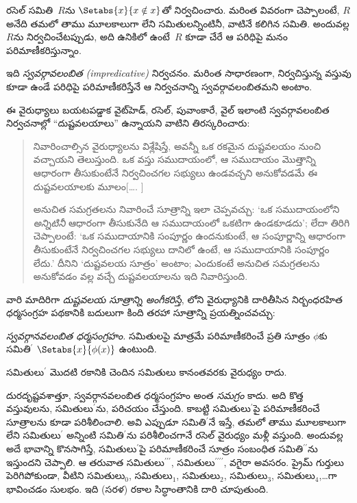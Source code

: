 \documentclass[../../../include/open-logic-section]{subfiles}
\begin{document}


రసెల్ సమితి~$R$ను
$\Setabs{x}{x \notin
x}$తో నిర్వచించారు. మరింత
వివరంగా చెప్పాలంటే, $R$
అనేది తమలో తాము మూలకాలుగా
లేని సమితులన్నింటినీ,
వాటినే కలిగిన సమితి.
అందువల్ల $R$ను నిర్వచించేటప్పుడు, అది ఉనికిలో ఉంటే~$R$ కూడా
చేరే ఆ పరిధిపై మనం పరిమాణీకరిస్తున్నాం.

ఇది \emph{స్వవర్గావలంబిత
(impredicative)} నిర్వచనం.
మరింత సాధారణంగా, నిర్వచిస్తున్న వస్తువు కూడా
ఉండే పరిధిపై పరిమాణీకరిస్తేనే ఆ నిర్వచనాన్ని
స్వవర్గావలంబితమని అంటాం.
	
ఈ వైరుధ్యాలు బయటపడ్డాక వైట్‌హెడ్,
రసెల్, పువాంకారే, వైల్
ఇలాంటి స్వవర్గావలంబిత
నిర్వచనాల్లో ``దుష్టవలయాలు'' ఉన్నాయని
వాటిని తిరస్కరించారు:
\begin{quote}
	నివారించాల్సిన వైరుధ్యాలను
	విశ్లేషిస్తే, అవన్నీ ఒక రకమైన
	దుష్టవలయం నుంచి వచ్చాయని
	తెలుస్తుంది. ఒక వస్తు సముదాయంలో,
	ఆ సముదాయం మొత్తాన్ని ఆధారంగా
	తీసుకుంటేనే నిర్వచించగల
	సభ్యులు ఉండవచ్చని
	అనుకోవడమే ఈ దుష్టవలయాలకు
	మూలం[\ldots. \textparagraph]

	అనుచిత సమగ్రతలను నివారించే
	సూత్రాన్ని ఇలా చెప్పవచ్చు:
	`ఒక సముదాయంలోని \emph{అన్నిటినీ}
	ఆధారంగా తీసుకునేది ఆ
	సముదాయంలో ఒకటిగా ఉండకూడదు';
	లేదా తిరిగి చెప్పాలంటే:
	`ఒక సముదాయానికి సంపూర్ణం
	ఉందనుకుంటే, ఆ సంపూర్ణాన్ని
	ఆధారంగా తీసుకుంటేనే
	నిర్వచించగల సభ్యులు దానిలో
	ఉంటే, ఆ సముదాయానికి
	సంపూర్ణం లేదు.' దీనిని
	`దుష్టవలయ సూత్రం' అంటాం;
	ఎందుకంటే అనుచిత సమగ్రతలను
	అనుకోవడం వల్ల వచ్చే
	దుష్టవలయాలను ఇది
	నివారిస్తుంది.
	\citep[p.~37]{WhiteheadRussell1910}
\end{quote}
వారి మాదిరిగా \emph{దుష్టవలయ
సూత్రాన్ని అంగీకరిస్తే},
లోని
వైరుధ్యానికి దారితీసిన నిర్బంధరహిత ధర్మసంగ్రహ పథకానికి
బదులుగా కింది తరహా సూత్రాన్ని ప్రయత్నించవచ్చు:

\begin{defish}
\emph{స్వవర్గానవలంబిత ధర్మసంగ్రహం.}
సమితులపై మాత్రమే పరిమాణీకరించే ప్రతి సూత్రం $\phi$కు
సమితి$^\prime$ $\Setabs{x}{\phi(x)}$ ఉంటుంది.
\end{defish}

సమితులు$^{\prime}$ మొదటి రకానికి చెందిన సమితులు కానంతవరకు
వైరుధ్యం రాదు.

దురదృష్టవశాత్తూ,
స్వవర్గానవలంబిత ధర్మసంగ్రహం
అంత \emph{సమగ్రం} కాదు.
అది కొత్త వస్తువులను,
సమితులు$^\prime$ను,
పరిచయం చేస్తుంది. కాబట్టి
సమితులు$^\prime$పై
పరిమాణీకరించే సూత్రాలను
కూడా పరిశీలించాలి. అవి
ఎప్పుడూ సమితి$^\prime$నే
ఇస్తే, తమలో తాము మూలకాలుగా
లేని సమితులు$^\prime$
అన్నింటి సమితి$^\prime$ను
పరిశీలించగానే రసెల్
వైరుధ్యం మళ్లీ వస్తుంది.
అందువల్ల అదే భావాన్ని
కొనసాగిస్తే, సమితులు$^\prime$పై
పరిమాణీకరించే సూత్రం
సంబంధిత సమితి$^{\prime\prime}$ను
ఇస్తుందని చెప్పాలి. ఆ తరువాత
సమితులు$^{\prime\prime\prime}$,
సమితులు$^{\prime\prime\prime\prime}$,
వగైరా అవసరం. ప్రైమ్ గుర్తులు
పెరిగిపోకుండా, వీటిని
సమితులు$_0$, సమితులు$_1$,
సమితులు$_2$, సమితులు$_3$,
సమితులు$_4$,\ldots గా
భావించడం సులభం. ఇది
(సరళ) రకాల సిద్ధాంతానికి
దారి చూపుతుంది.
\end{document}
